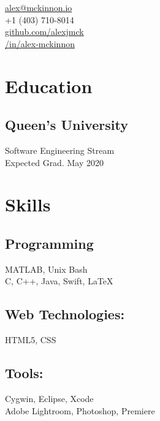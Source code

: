 \documentclass[]{hieudo-build}
\begin{document}
%
%
{
	\faEnvelope \href{mailto:alex@mckinnon.io}{ alex@mckinnon.io}\\
	\faPhone \thinspace +1 (403) 710-8014\\
	\faGithub \href{https://github.com/alexjmck}{   github.com/alexjmck}\\
	\faLinkedinSquare \href{https://www.linkedin.com/in/alex-mckinnon}{   /in/alex-mckinnon}
}
    
%
%
\begin{minipage}[t]{0.34\textwidth} 

\section{Education} 

\subsection{Queen's University}
Software Engineering Stream \\
Expected Grad. May 2020 \\
\sectionsep

\section{Skills}
\subsection{Programming}
MATLAB, Unix Bash\\ 
C, C++, Java, Swift, \LaTeX

\subsection{Web Technologies:}
HTML5, CSS \\

\subsection{Tools:}
Cygwin, Eclipse, Xcode\\
Adobe Lightroom, Photoshop, Premiere \\ 


\end{minipage}
\end{document}
